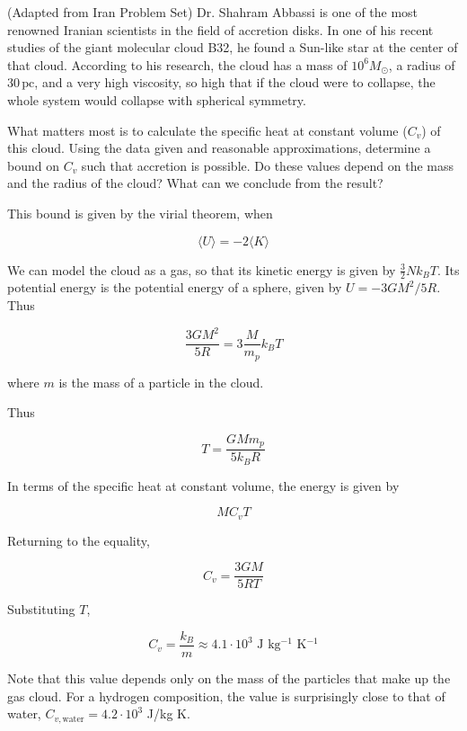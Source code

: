 \documentclass[11pt]{article}
\begin{document}
\begin{pproblem} (Adapted from Iran Problem Set)
    Dr. Shahram Abbassi is one of the most renowned Iranian scientists in the field of accretion disks. In one of his recent studies of the giant molecular cloud B32, he found a Sun-like star at the center of that cloud. According to his research, the cloud has a mass of $10^6 M_\odot$, a radius of $30 \, \text{pc}$, and a very high viscosity, so high that if the cloud were to collapse, the whole system would collapse with spherical symmetry.

    What matters most is to calculate the specific heat at constant volume ($C_v$) of this cloud. Using the data given and reasonable approximations, determine a bound on $C_v$ such that accretion is possible. Do these values depend on the mass and the radius of the cloud? What can we conclude from the result?
\begin{pssolution*}{}{}
    This bound is given by the virial theorem, when

    \[\langle U \rangle = -2 \langle K \rangle\]

    We can model the cloud as a gas, so that its kinetic energy is given by \(\frac{3}{2} N k_B T\). Its potential energy is the potential energy of a sphere, given by \(U = -3GM^2/5R\). Thus

    \[\frac{3GM^2}{5R} = 3\frac{M}{m_p}k_B T\]

    where \(m\) is the mass of a particle in the cloud.

    Thus

    \[T = \frac{GMm_p}{5k_B R}\]

    In terms of the specific heat at constant volume, the energy is given by

    \[M C_v T\]

    Returning to the equality,

    \[C_v = \frac{3GM}{5R T}\]

    Substituting \(T\),

    \[\boxed{C_v = \frac{k_B }{m} \approx 4.1 \cdot 10^3 \text{ J kg\(^{-1}\) K\(^{-1}\)}}\]

    Note that this value depends only on the mass of the particles that make up the gas cloud. For a hydrogen composition, the value is surprisingly close to that of water, \(C_{v, \text{water}} = 4.2\cdot 10^{3}\) J/kg K.
\end{pssolution*}
\end{pproblem}
\end{document}
